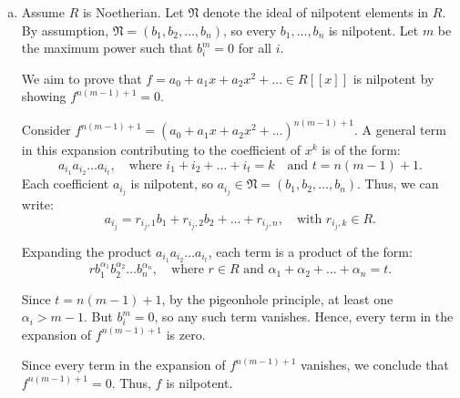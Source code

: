 \documentclass[12pt, letterpaper]{article}
\theoremstyle{definition}
\begin{document}
\begin{enumerate}[(a)]
    \textbf{Base Case:} Since $f^n = 0$, the constant term $a_0^n = 0$. Hence, $a_0$ is nilpotent.
    
    \textbf{Inductive Step:} Assume that all coefficients $a_0, a_1, \dots, a_{n-1}$ are nilpotent. Consider the coefficient $a_n$.
    
    Since $a_0, a_1x, \dots, a_{n-1}x^{n-1}$ are nilpotent by the inductive hypothesis, it follows that their sum, $a_0 + a_1x + \dots + a_{n-1}x^{n-1}$, is also nilpotent. This is because the sum of nilpotent elements is nilpotent.
    
    Now, consider $f - (a_0 + a_1x + \dots + a_{n-1}x^{n-1})$. This simplifies to $a_nx^n + a_{n+1}x^{n+1} + \dots$. Since $f$ is nilpotent, the difference $f - (a_0 + a_1x + \dots + a_{n-1}x^{n-1})$ is also nilpotent. Hence, there exists some $k \in \mathbb{N}$ such that 
    \[
    (f - (a_0 + a_1x + \dots + a_{n-1}x^{n-1})\big)^k = 0.
    \]
    
    Expanding this expression, the leading term is $a_n^kx^{nk}$. Since the entire expression equals zero, it follows that $a_n^k = 0$. Therefore, $a_n$ is nilpotent.
    
    By induction, all coefficients of $f$ are nilpotent.

    The converse is not true.
    \item Assume $R$ is Noetherian. Let $\mathfrak{N}$ denote the ideal of nilpotent elements in $R$. By assumption, $\mathfrak{N} = (b_1, b_2, \dots, b_n)$, so every $b_1, \dots, b_n$ is nilpotent. Let \( m \) be the maximum power such that \( b_i^m = 0 \) for all \( i \). 

    We aim to prove that \( f = a_0 + a_1x + a_2x^2 + \dots \in R[[x]] \) is nilpotent by showing \( f^{n(m-1)+1} = 0 \).
    
    Consider \( f^{n(m-1)+1} = (a_0 + a_1x + a_2x^2 + \dots)^{n(m-1)+1} \). A general term in this expansion contributing to the coefficient of \( x^k \) is of the form:
    \[
    a_{i_1}a_{i_2}\dots a_{i_t}, \quad \text{where } i_1 + i_2 + \dots + i_t = k \quad \text{and } t = n(m-1)+1.
    \]
    Each coefficient \( a_{i_j} \) is nilpotent, so \( a_{i_j} \in \mathfrak{N} = (b_1, b_2, \dots, b_n) \). Thus, we can write:
    \[
    a_{i_j} = r_{i_j,1}b_1 + r_{i_j,2}b_2 + \dots + r_{i_j,n}, \quad \text{with } r_{i_j,k} \in R.
    \]
    
    Expanding the product \( a_{i_1}a_{i_2}\dots a_{i_t} \), each term is a product of the form:
    \[
    rb_1^{\alpha_1}b_2^{\alpha_2}\dots b_n^{\alpha_n}, \quad \text{where $r \in R$ and } \alpha_1 + \alpha_2 + \dots + \alpha_n = t.
    \]
    
    Since \( t = n(m-1)+1 \), by the pigeonhole principle, at least one \( \alpha_i > m-1 \). But \( b_i^m = 0 \), so any such term vanishes. Hence, every term in the expansion of \( f^{n(m-1)+1} \) is zero.
    
    Since every term in the expansion of \( f^{n(m-1)+1} \) vanishes, we conclude that \( f^{n(m-1)+1} = 0 \). Thus, \( f \) is nilpotent.
\end{enumerate}
\end{document}
